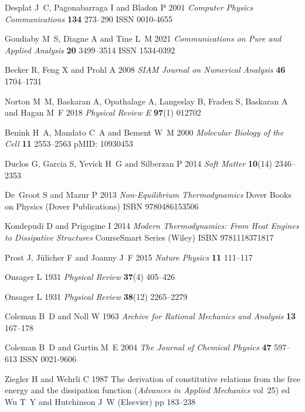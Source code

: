 \documentclass[12pt]{iopart}
\begin{document}
\begin{thebibliography}{100}
				Desplat J~C, Pagonabarraga I and Bladon P 2001 {\em Computer Physics
				  Communications\/} {\bf 134} 273--290 ISSN 0010-4655
				
				Goudiaby M~S, Diagne A and Tine L~M 2021 {\em Communications on Pure and
				  Applied Analysis\/} {\bf 20} 3499--3514 ISSN 1534-0392
				
				Becker R, Feng X and Prohl A 2008 {\em SIAM Journal on Numerical Analysis\/}
				  {\bf 46} 1704--1731
				
				Norton M~M, Baskaran A, Opathalage A, Langeslay B, Fraden S, Baskaran A and
				  Hagan M~F 2018 {\em Physical Review E\/} {\bf 97}(1) 012702
				
				Benink H~A, Mandato C~A and Bement W~M 2000 {\em Molecular Biology of the
				  Cell\/} {\bf 11} 2553--2563 pMID: 10930453
				
				Duclos G, Garcia S, Yevick H~G and Silberzan P 2014 {\em Soft Matter\/} {\bf
				  10}(14) 2346--2353
				
				De~Groot S and Mazur P 2013 {\em Non-Equilibrium Thermodynamics\/} Dover Books
				  on Physics (Dover Publications) ISBN 9780486153506
				
				Kondepudi D and Prigogine I 2014 {\em Modern Thermodynamics: From Heat Engines
				  to Dissipative Structures\/} CourseSmart Series (Wiley) ISBN 9781118371817
				
				Prost J, J{\"u}licher F and Joanny J~F 2015 {\em Nature Physics\/} {\bf 11}
				  111--117
				
				Onsager L 1931 {\em Physical Review\/} {\bf 37}(4) 405--426
				
				Onsager L 1931 {\em Physical Review\/} {\bf 38}(12) 2265--2279
				
				Coleman B~D and Noll W 1963 {\em Archive for Rational Mechanics and Analysis\/}
				  {\bf 13} 167--178
				
				Coleman B~D and Gurtin M~E 2004 {\em The Journal of Chemical Physics\/} {\bf
				  47} 597--613 ISSN 0021-9606
				
				Ziegler H and Wehrli C 1987 The derivation of constitutive relations from the
				  free energy and the dissipation function ({\em Advances in Applied
				  Mechanics\/} vol~25) ed Wu T~Y and Hutchinson J~W (Elsevier) pp 183--238
				

\end{thebibliography}
\end{document}
